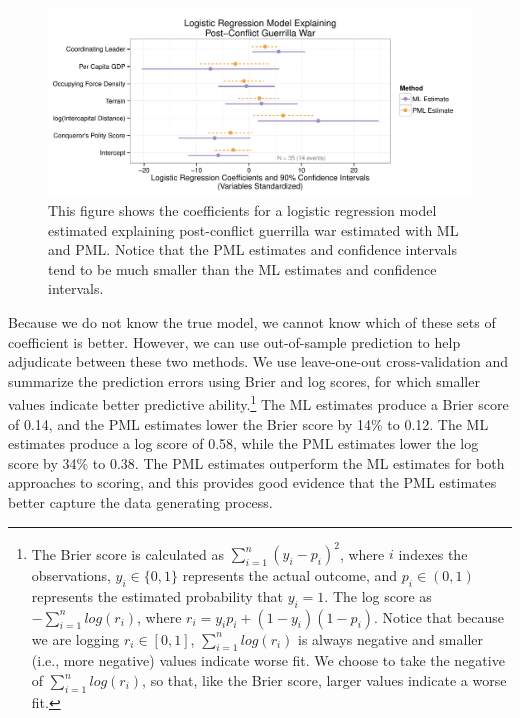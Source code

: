 \documentclass[12pt]{article}
\begin{document}
\begin{figure}[h]
\begin{center}
\includegraphics[width = \textwidth]{figs/weisiger-coefs.pdf}
\caption{This figure shows the coefficients for a logistic regression model estimated explaining post-conflict guerrilla war estimated with ML and PML. 
Notice that the PML estimates and confidence intervals tend to be much smaller than the ML estimates and confidence intervals.}\label{fig:weisiger-coefs}
\end{center}
\end{figure}

Because we do not know the true model, we cannot know which of these sets of coefficient is better. 
However, we can use out-of-sample prediction to help adjudicate between these two methods. 
We use leave-one-out cross-validation and summarize the prediction errors using Brier and log scores, for which smaller values indicate better predictive ability.\footnote{The Brier score is calculated as $\sum_{i = 1}^n (y_i - p_i)^2$, where $i$ indexes the observations, $y_i \in \{0, 1\}$ represents the actual outcome, and $p_i \in (0, 1)$ represents the estimated probability that $y_i = 1$. 
The log score as $-\sum_{i = 1}^n log(r_i)$, where $r_i = y_i p_i + (1 - y_i)(1 - p_i)$. 
Notice that because we are logging $r_i \in [0, 1]$, $\sum_{i = 1}^n log(r_i)$ is always negative and smaller (i.e., more negative) values indicate worse fit. 
We choose to take the negative of $\sum_{i = 1}^n log(r_i)$, so that, like the Brier score, larger values indicate a worse fit.} 
The ML estimates produce a Brier score of 0.14, and the PML estimates lower the Brier score by 14\% to 0.12. 
The ML estimates produce a log score of 0.58, while the PML estimates lower the log score by 34\% to 0.38. 
The PML estimates outperform the ML estimates for both approaches to scoring, and
this provides good evidence that the PML estimates better capture the data generating process.
\end{document}
